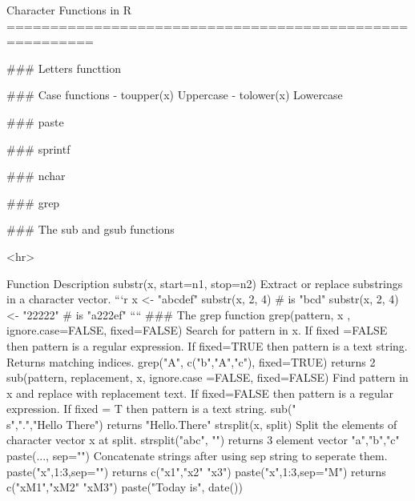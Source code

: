 Character Functions in R
========================================================

### Letters functtion

### Case functions
 - toupper(x)	Uppercase
 - tolower(x)	Lowercase


### paste

### sprintf

### nchar

### grep

### The sub and gsub functions

<hr>

Function	Description
substr(x, start=n1, stop=n2)	Extract or replace substrings in a character vector.
```{r}
x <- "abcdef" 
substr(x, 2, 4) # is "bcd" 
substr(x, 2, 4) <- "22222" # is "a222ef"
````
### The grep function
grep(pattern, x , ignore.case=FALSE, fixed=FALSE)	Search for pattern in x. If fixed =FALSE then pattern is a regular expression. If fixed=TRUE then pattern is a text string. Returns matching indices.
grep("A", c("b","A","c"), fixed=TRUE) returns 2
sub(pattern, replacement, x, ignore.case =FALSE, fixed=FALSE)	Find pattern in x and replace with replacement text. If fixed=FALSE then pattern is a regular expression.
If fixed = T then pattern is a text string. 
sub("\\s",".","Hello There") returns "Hello.There"
strsplit(x, split)	Split the elements of character vector x at split. 
strsplit("abc", "") returns 3 element vector "a","b","c"
paste(..., sep="")	Concatenate strings after using sep string to seperate them.
paste("x",1:3,sep="") returns c("x1","x2" "x3")
paste("x",1:3,sep="M") returns c("xM1","xM2" "xM3")
paste("Today is", date())
